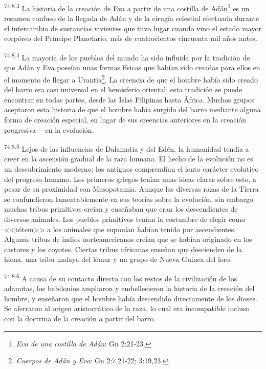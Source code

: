 \par
\textsuperscript{74:8.3} La historia de la creación de Eva a partir de una costilla de Adán\footnote{\textit{Eva de una costilla de Adán}: Gn 2:21-23.} es un resumen confuso de la llegada de Adán y de la cirugía celestial efectuada durante el intercambio de sustancias vivientes que tuvo lugar cuando vino el estado mayor corpóreo del Príncipe Planetario, más de cuatrocientos cincuenta mil años antes.

\par
\textsuperscript{74:8.4} La mayoría de los pueblos del mundo ha sido influida por la tradición de que Adán y Eva poseían unas formas físicas que habían sido creadas para ellos en el momento de llegar a Urantia\footnote{\textit{Cuerpos de Adán y Eva}: Gn 2:7,21-22; 3:19,23.}. La creencia de que el hombre había sido creado del barro era casi universal en el hemisferio oriental; esta tradición se puede encontrar en todas partes, desde las Islas Filipinas hasta África. Muchos grupos aceptaron esta historia de que el hombre había surgido del barro mediante alguna forma de creación especial, en lugar de sus creencias anteriores en la creación progresiva ---en la evolución.

\par
\textsuperscript{74:8.5} Lejos de las influencias de Dalamatia y del Edén, la humanidad tendía a creer en la ascensión gradual de la raza humana. El hecho de la evolución no es un descubrimiento moderno; los antiguos comprendían el lento carácter evolutivo del progreso humano. Los primeros griegos tenían unas ideas claras sobre esto, a pesar de su proximidad con Mesopotamia. Aunque las diversas razas de la Tierra se confundieron lamentablemente en sus teorías sobre la evolución, sin embargo muchas tribus primitivas creían y enseñaban que eran los descendientes de diversos animales. Los pueblos primitivos tenían la costumbre de elegir como <<tótem>> a los animales que suponían habían tenido por ascendientes. Algunas tribus de indios norteamericanos creían que se habían originado en los castores y los coyotes. Ciertas tribus africanas enseñan que descienden de la hiena, una tribu malaya del lémur y un grupo de Nueva Guinea del loro.

\par
\textsuperscript{74:8.6} A causa de su contacto directo con los restos de la civilización de los adamitas, los babilonios ampliaron y embellecieron la historia de la creación del hombre, y enseñaron que el hombre había descendido directamente de los dioses. Se aferraron al origen aristocrático de la raza, lo cual era incompatible incluso con la doctrina de la creación a partir del barro.

